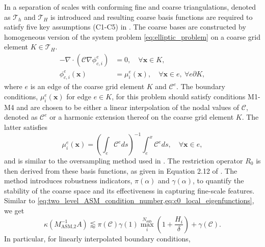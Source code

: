 In \cite{msfem_coarse_space_Graham_2007,msfem_for_darcy_Efendiev2011} a separation of scales with conforming fine and coarse triangulations, denoted as $\mathcal{T}_h$ and $\mathcal{T}_H$ is introduced and resulting coarse basis functions are required to satisfy five key assumptions (C1-C5) in \cite[Section 2.2]{msfem_coarse_space_Graham_2007}. The coarse bases are constructed by homogeneous version of the system problem \cref{eq:elliptic_problem} on a coarse grid element $K\in\mathcal{T}_H$.
\begin{equation}
    \begin{aligned}
        -\nabla\cdot(\mathcal{C} \nabla \phi^e_{c,i}) &= 0, \quad \forall \mathbf{x} \in K,\\
        \phi^e_{c,i}(\mathbf{x}) &= \mu^e_i(\mathbf{x}), \quad \forall \mathbf{x} \in e, \ \forall e \partial K,
    \end{aligned}
    \label{eq:msfem_coarse_basis}
\end{equation}
where $e$ is an edge of the coarse grid element $K$ and $\mathcal{C}^e$. The boundary conditions, $\mu^e_i(\mathbf{x})$ for edge $e\in K$, for this problem should satisfy conditions M1-M4 \cite[Section 4]{msfem_coarse_space_Graham_2007} and are chosen to be either a linear interpolation of the nodal values of $\mathcal{C}$, denoted as $\mathcal{C}^e$ or a harmonic extension thereof on the coarse grid element $K$. The latter satisfies
\begin{equation}
    \mu^e_i(\mathbf{x}) = \left(\int_e \mathcal{C}^e ds\right)^{-1}\int_e^x \mathcal{C}^e ds, \quad \forall \mathbf{x} \in e,
    \label{eq:msfem_harmonic_extension}
\end{equation}
and is similar to the oversampling method used in \cite{og_msfem_Hou1997}. The restriction operator $R_0$ is then derived from these basis functions, as given in Equation 2.12 of \cite{msfem_coarse_space_Graham_2007}. The method introduces robustness indicators, $\pi(\alpha)$ and $\gamma(\alpha)$, to quantify the stability of the coarse space and its effectiveness in capturing fine-scale features. Similar to \cref{eq:two_level_ASM_condition_number,eq:c0_local_eigenfunctions}, we get \cite[Theorem 3.9]{msfem_coarse_space_Graham_2007}
\begin{equation}
    \kappa(M^{-1}_{\text{ASM,2}}A) \lessapprox \pi(\mathcal{C})\gamma(1)\max_i^{N_{\text{sub}}}\left(1+\frac{H_i}{\delta}\right) + \gamma(\mathcal{C}).
    \label{eq:msfem_condition_number}
\end{equation}
In particular, for linearly interpolated boundary conditions, 
